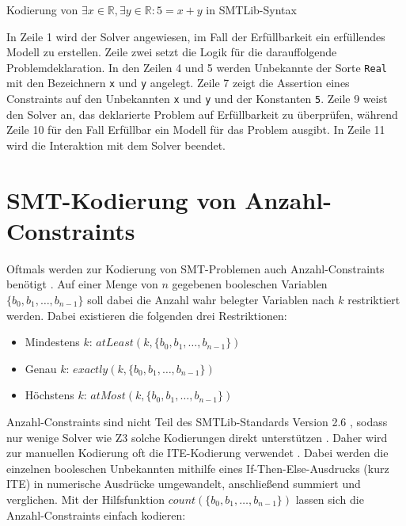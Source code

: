\begin{listing}[H]
    \inputminted[linenos=true]{bash}{Code/SMT/SMTLibSimple.smt2}
    \caption{Kodierung von $\exists x \in \mathbb{R}, \exists y \in \mathbb{R}: 5 = x + y$ in SMTLib-Syntax}
    \label{listing:smtlibsimple}
\end{listing}

In Zeile 1 wird der Solver angewiesen, im Fall der Erfüllbarkeit ein erfüllendes Modell zu erstellen.
Zeile zwei setzt die Logik für die darauffolgende Problemdeklaration.
In den Zeilen 4 und 5 werden Unbekannte der Sorte \texttt{Real} mit den Bezeichnern \texttt{x} und \texttt{y} angelegt.
Zeile 7 zeigt die Assertion eines Constraints auf den Unbekannten \texttt{x} und \texttt{y} und der Konstanten \texttt{5}.
Zeile 9 weist den Solver an, das deklarierte Problem auf Erfüllbarkeit zu überprüfen, während Zeile 10 für den Fall Erfüllbar ein Modell für das Problem ausgibt.
In Zeile 11 wird die Interaktion mit dem Solver beendet.

\section{SMT-Kodierung von Anzahl-Constraints}
\label{sec:smtcardinality}
Oftmals werden zur Kodierung von SMT-Problemen auch Anzahl-Constraints benötigt \cite{kovasznai}.
Auf einer Menge von $n$ gegebenen booleschen Variablen $\{b_0, b_1, \ldots, b_{n-1}\}$ soll dabei die Anzahl wahr belegter Variablen nach $k$ restriktiert werden.
Dabei existieren die folgenden drei Restriktionen:
\begin{itemize}
    \item Mindestens $k$: $atLeast(k, \{b_0, b_1, \ldots, b_{n-1}\})$
    \item Genau $k$: $exactly(k, \{b_0, b_1, \ldots, b_{n-1}\})$
    \item Höchstens $k$: $atMost(k, \{b_0, b_1, \ldots, b_{n-1}\})$
\end{itemize}

Anzahl-Constraints sind nicht Teil des SMTLib-Standards Version 2.6 \cite{smtlib}, sodass nur wenige Solver wie Z3 solche Kodierungen direkt unterstützen \cite{z3Cardinality}.
Daher wird zur manuellen Kodierung oft die ITE-Kodierung verwendet \cite{kovasznai}.
Dabei werden die einzelnen booleschen Unbekannten mithilfe eines If-Then-Else-Ausdrucks (kurz ITE) in numerische Ausdrücke umgewandelt, anschließend summiert und verglichen.
Mit der Hilfsfunktion $count(\{b_0, b_1, \ldots, b_{n-1}\})$ lassen sich die Anzahl-Constraints einfach kodieren:

